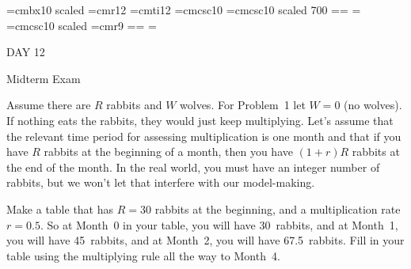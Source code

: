
\def\folio{\ifnum\pageno>0 \number\pageno \else
   \ifnum\pageno<0 \romannumeral-\pageno \else\fi\fi}

\font\largebf=cmbx10  scaled 
\font\largerm=cmr12
\font\largeit=cmti12
\font\tensc=cmcsc10
\font\sevensc=cmcsc10 scaled 700
\newfam\scfam \def\sc{\fam\scfam\tensc}
\textfont\scfam=\tensc \scriptfont\scfam=\sevensc
\scriptscriptfont\scfam=\sevensc
\font\largesc=cmcsc10 scaled 
\font\ninerm=cmr9
\newfam\srfam \def\sr{\fam\srfam\ninerm}
\textfont\srfam=\ninerm \scriptfont\srfam=\sevenrm
\scriptscriptfont\srfam=\fiverm




\null\vskip36pt

\centerline{\largerm DAY 12}
\nobreak\bigskip

\centerline{\largeit Midterm Exam}
\nobreak\bigskip


\bigskip


\bigskip


\bigskip

\nobreak\bigskip

\noindent Assume there are $R$ rabbits and $W$ wolves. For Problem~1 let $W=0$ (no wolves). If nothing eats the rabbits, they would just keep multiplying. Let's assume that the relevant time period for assessing multiplication is one month and that if you have $R$ rabbits at the beginning of a month, then you have $(1 + r)R$ rabbits at the end of the month. In the real world, you must have an integer number of rabbits, but we won't let that interfere with our model-making.

Make a table that has $R=30$ rabbits at the beginning, and a multiplication rate $r=0.5$. So at Month~0 in your table, you will have 30~rabbits, and at Month~1, you will have 45~rabbits, and at Month~2, you will have 67.5~rabbits. Fill in your table using the multiplying rule all the way to Month~4.

